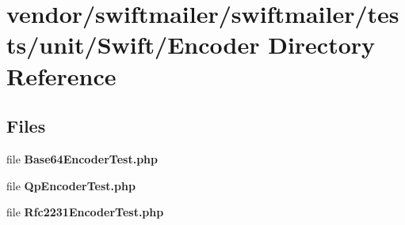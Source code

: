 \section{vendor/swiftmailer/swiftmailer/tests/unit/\+Swift/\+Encoder Directory Reference}
\label{dir_1ff805b3b16250c7b2de3293cb48516d}
\subsection*{Files}
\begin{DoxyCompactItemize}
\item 
file {\bf Base64\+Encoder\+Test.\+php}
\item 
file {\bf Qp\+Encoder\+Test.\+php}
\item 
file {\bf Rfc2231\+Encoder\+Test.\+php}
\end{DoxyCompactItemize}
